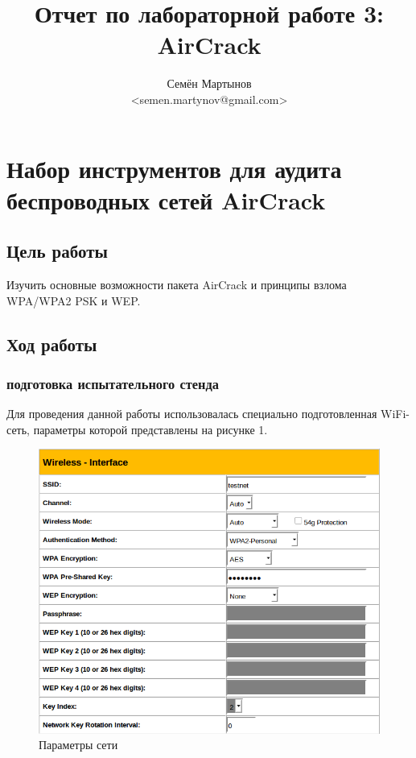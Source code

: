 \documentclass[a4paper, 12pt]{article}		%
\author{Семён Мартынов\\<semen.martynov@gmail.com>}
\title{Отчет по лабораторной работе 3:\\AirCrack}
\begin{document}
\maketitle
\tableofcontents{}


\newpage
\section{Набор инструментов для аудита беспроводных сетей AirCrack}

\subsection{Цель работы}

Изучить основные возможности пакета AirCrack и принципы взлома WPA/WPA2 PSK и WEP.

\subsection{Ход работы}

\subsubsection{подготовка испытательного стенда}

Для проведения данной работы использовалась специально подготовленная WiFi-сеть, параметры которой представлены на рисунке 1.

\begin{figure}[h!]
\centering
\includegraphics[scale=0.45]{res/pic01}
\caption{Параметры сети}
\end{figure}
\end{document}
